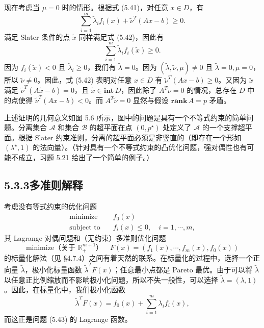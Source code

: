 \documentclass[UTF8, 12pt, fontset=fandol, oneside]{ctexart}
\begin{document}
现在考虑当 $\mu=0$ 时的情形。根据式 (5.41)，对任意 $x\in D$，有
\begin{equation}
\sum_{i=1}^m \tilde{\lambda}_i f_i(x)+\tilde{\nu}^T(Ax-b)\geq 0.
\tag{5.42}
\end{equation}
满足 Slater 条件的点 $\tilde{x}$ 同样满足式 (5.42)，因此有
\[
\sum_{i=1}^m \tilde{\lambda}_i f_i(\tilde{x})\geq 0.
\]
因为 $f_i(\tilde{x})<0$ 且 $\tilde{\lambda}_i\geq 0$，我们有 $\tilde{\lambda}=0$。因为 $(\tilde{\lambda},\tilde{\nu},\mu)\neq 0$ 且 $\tilde{\lambda}=0,\mu=0$，所以 $\tilde{\nu}\neq 0$。因此，式 (5.42) 表明对任意 $x\in D$ 有 $\tilde{\nu}^T(Ax-b)\geq 0$。又因为 $\tilde{x}$ 满足 $\tilde{\nu}^T(A\tilde{x}-b)=0$，且 $\tilde{x}\in\mathbf{int}\,D$，因此除了 $A^T\tilde{\nu}=0$ 的情况，总存在 $D$ 中的点使得 $\tilde{\nu}^T(Ax-b)<0$。而 $A^T\tilde{\nu}=0$ 显然与假设 $\mathbf{rank}\,A=p$ 矛盾。

上述证明的几何意义如图 5.6 所示，图中的问题是具有一个不等式约束的简单问题。分离集合 $\mathcal{A}$ 和集合 $\mathcal{B}$ 的超平面在点 $(0,p^\star)$ 处定义了 $\mathcal{A}$ 的一个支撑超平面。根据 Slater 约束准则，分离的超平面必须是非竖直的（即存在一个形如 $(\lambda^\star,1)$ 的法向量）。（针对具有一个不等式约束的凸优化问题，强对偶性也有可能不成立，习题 5.21 给出了一个简单的例子。）

\subsection*{5.3.3\quad 多准则解释}

考虑没有等式约束的优化问题
\begin{equation}
\begin{aligned}
\text{minimize}\quad & f_0(x)\\
\text{subject to}\quad & f_i(x)\leq 0,\quad i=1,\cdots,m,
\end{aligned}
\tag{5.43}
\end{equation}
其 Lagrange 对偶问题和（无约束）多准则优化问题
\begin{equation}
\text{minimize（关于 $\mathbb{R}_+^{m+1}$）}\quad
F(x)=(f_1(x),\cdots,f_m(x),f_0(x))
\tag{5.44}
\end{equation}
的标量化解法（见 §4.7.4）之间有着天然的联系。在标量化的过程中，选择一个正向量 $\tilde{\lambda}$，极小化标量函数 $\tilde{\lambda}^TF(x)$；任意最小点都是 Pareto 最优。由于可以将 $\tilde{\lambda}$ 以任意正比例缩放而不影响极小化问题，所以不失一般性，可以选择 $\tilde{\lambda}=(\lambda,1)$。因此，在标量化中，我们极小化函数
\[
\tilde{\lambda}^TF(x)=f_0(x)+\sum_{i=1}^m\lambda_i f_i(x),
\]
而这正是问题 (5.43) 的 Lagrange 函数。
\end{document}
